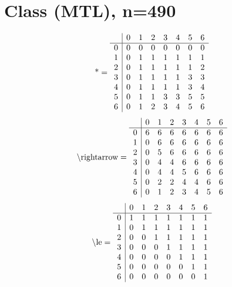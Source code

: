 \documentclass[11pt]{article}
\begin{document}
\section{Class (MTL), n=490}
\[\text{*} = 
\begin{array}{r | r r r r r r r}
 & 0 & 1 & 2 & 3 & 4 & 5 & 6 \\ \hline
0 & 0 & 0 & 0 & 0 & 0 & 0 & 0 \\
1 & 0 & 1 & 1 & 1 & 1 & 1 & 1 \\
2 & 0 & 1 & 1 & 1 & 1 & 1 & 2 \\
3 & 0 & 1 & 1 & 1 & 1 & 3 & 3 \\
4 & 0 & 1 & 1 & 1 & 1 & 3 & 4 \\
5 & 0 & 1 & 1 & 3 & 3 & 5 & 5 \\
6 & 0 & 1 & 2 & 3 & 4 & 5 & 6 \\
\end{array}
\]
\[\text{\textbackslash rightarrow} = 
\begin{array}{r | r r r r r r r}
 & 0 & 1 & 2 & 3 & 4 & 5 & 6 \\ \hline
0 & 6 & 6 & 6 & 6 & 6 & 6 & 6 \\
1 & 0 & 6 & 6 & 6 & 6 & 6 & 6 \\
2 & 0 & 5 & 6 & 6 & 6 & 6 & 6 \\
3 & 0 & 4 & 4 & 6 & 6 & 6 & 6 \\
4 & 0 & 4 & 4 & 5 & 6 & 6 & 6 \\
5 & 0 & 2 & 2 & 4 & 4 & 6 & 6 \\
6 & 0 & 1 & 2 & 3 & 4 & 5 & 6 \\
\end{array}
\]
\[\text{\textbackslash le} = 
\begin{array}{r | r r r r r r r}
 & 0 & 1 & 2 & 3 & 4 & 5 & 6 \\ \hline
0 & 1 & 1 & 1 & 1 & 1 & 1 & 1 \\
1 & 0 & 1 & 1 & 1 & 1 & 1 & 1 \\
2 & 0 & 0 & 1 & 1 & 1 & 1 & 1 \\
3 & 0 & 0 & 0 & 1 & 1 & 1 & 1 \\
4 & 0 & 0 & 0 & 0 & 1 & 1 & 1 \\
5 & 0 & 0 & 0 & 0 & 0 & 1 & 1 \\
6 & 0 & 0 & 0 & 0 & 0 & 0 & 1 \\
\end{array}
\]
\end{document}
